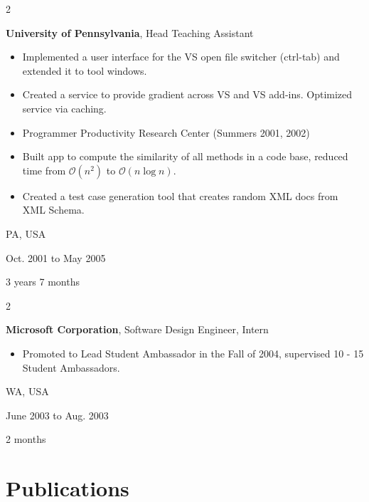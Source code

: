\documentclass[10pt, letterpaper]{article}
\newenvironment{highlights}{
    \begin{itemize}[
        topsep=0.10 cm,
        parsep=0.10 cm,
        partopsep=0pt,
        itemsep=0pt,
        leftmargin=0.4 cm + 10pt
    ]
}{
    \end{itemize}
} %
\newenvironment{twocolentry}[2][]{
    \onecolentry
    \def\secondColumn{#2}
    \setcolumnwidth{\fill, 4.5 cm}
    \begin{paracol}{2}
}{
    \switchcolumn \raggedleft \secondColumn
    \end{paracol}
    \endonecolentry
} %
\begin{document}
        \begin{twocolentry}{
            PA, USA

        Oct. 2001 to May 2005

        3 years 7 months
        }
            \textbf{University of Pennsylvania}, Head Teaching Assistant
            \begin{highlights}
                \item Implemented a user interface for the VS open file switcher (ctrl-tab) and extended it to tool windows.
                \item Created a service to provide gradient across VS and VS add-ins. Optimized service via caching.
                \item Programmer Productivity Research Center (Summers 2001, 2002)
                \item Built app to compute the similarity of all methods in a code base, reduced time from $\mathcal{O}(n^2)$ to $\mathcal{O}(n \log n)$. 
                \item Created a test case generation tool that creates random XML docs from XML Schema.
            \end{highlights}
        \end{twocolentry}


        \vspace{0.2 cm}

        \begin{twocolentry}{
            WA, USA

        June 2003 to Aug. 2003

        2 months
        }
            \textbf{Microsoft Corporation}, Software Design Engineer, Intern
            \begin{highlights}
                \item Promoted to Lead Student Ambassador in the Fall of 2004, supervised 10 - 15 Student Ambassadors.
            \end{highlights}
        \end{twocolentry}



    
    \section{Publications}
\end{document}
